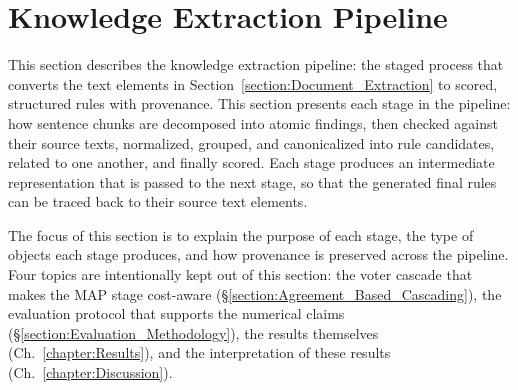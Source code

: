 \section{Knowledge Extraction Pipeline}\label{section:Knowledge_Extraction}

\makeatletter
{}
\makeatother

This section describes the knowledge extraction pipeline: the staged process that converts the text elements in Section~\ref{section:Document_Extraction} to scored, structured rules with provenance. This section presents each stage in the pipeline: how sentence chunks are decomposed into atomic findings, then checked against their source texts, normalized, grouped, and canonicalized into rule candidates, related to one another, and finally scored. Each stage produces an intermediate representation that is passed to the next stage, so that the generated final rules can be traced back to their source text elements. 

The focus of this section is to explain the purpose of each stage, the type of objects each stage produces, and how provenance is preserved across the pipeline. Four topics are intentionally kept out of this section: the voter cascade that makes the MAP stage cost-aware (§\ref{section:Agreement_Based_Cascading}), the evaluation protocol that supports the numerical claims (§\ref{section:Evaluation_Methodology}), the results themselves (Ch.~\ref{chapter:Results}), and the interpretation of these results (Ch.~\ref{chapter:Discussion}). 










% 